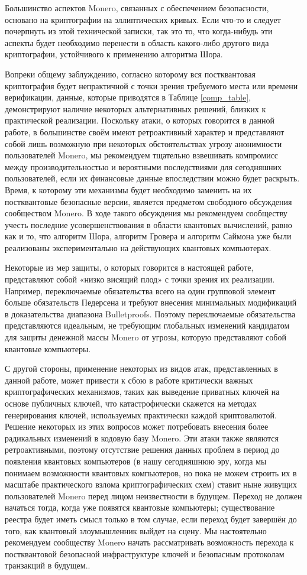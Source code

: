 \documentclass{mrl}
\begin{document}
Большинство аспектов Monero, связанных с обеспечением безопасности, основано на криптографии на эллиптических кривых. Если что-то и следует почерпнуть из этой технической записки, так это то, что когда-нибудь эти аспекты будет необходимо перенести в область какого-либо другого вида криптографии, устойчивого к применению алгоритма Шора.

Вопреки общему заблуждению, согласно которому вся постквантовая криптография будет непрактичной с точки зрения требуемого места или времени верификации, данные, которые приводятся в Таблице \ref{comp_table}, демонстрируют наличие некоторых альтернативных решений, близких к практической реализации. Поскольку атаки, о которых говорится в данной работе, в большинстве своём имеют ретроактивный характер и представляют собой лишь возможную при некоторых обстоятельствах угрозу анонимности пользователей Monero, мы рекомендуем тщательно взвешивать компромисс между производительностью и вероятными последствиями для сегодняшних пользователей, если их финансовые данные впоследствии можно будет раскрыть. Время, к которому эти механизмы будет необходимо заменить на их постквантовые безопасные версии, является предметом свободного обсуждения сообществом Monero. В ходе такого обсуждения мы рекомендуем сообществу учесть последние усовершенствования в области квантовых вычислений, равно как и то, что алгоритм Шора, алгоритм Гровера и алгоритм Саймона уже были реализованы экспериментально на действующих квантовых компьютерах. 

Некоторые из мер защиты, о которых говорится в настоящей работе, представляют собой «низко висящий плод» с точки зрения их реализации. Например, переключаемые обязательства всего на один групповой элемент больше обязательств Педерсена и требуют внесения минимальных модификаций в доказательства диапазона Bulletproofs. Поэтому переключаемые обязательства представляются идеальным, не требующим глобальных изменений кандидатом для защиты денежной массы Monero от угрозы, которую представляют собой квантовые компьютеры.

С другой стороны, применение некоторых из видов атак, представленных в данной работе, может привести к сбою в работе критически важных криптографических механизмов, таких как выведение приватных ключей на основе публичных ключей, что катастрофически скажется на методах генерирования ключей, используемых практически каждой криптовалютой. Решение некоторых из этих вопросов может потребовать внесения более радикальных изменений в кодовую базу Monero. Эти атаки также являются ретроактивными, поэтому отсутствие решения данных проблем в период до появления квантовых компьютеров (в нашу сегодняшнюю эру, когда мы понимаем возможности квантовых компьютеров, но пока не можем строить их в масштабе практического взлома криптографических схем) ставит ныне живущих пользователей Monero перед лицом неизвестности в будущем. Переход не должен начаться тогда, когда уже появятся квантовые компьютеры; существование реестра будет иметь смысл только в том случае, если переход будет завершён до того, как квантовый злоумышленник выйдет на сцену. Мы настоятельно рекомендуем сообществу Monero начать рассматривать возможность перехода к постквантовой безопасной инфраструктуре ключей и безопасным протоколам транзакций в будущем..
\end{document}
